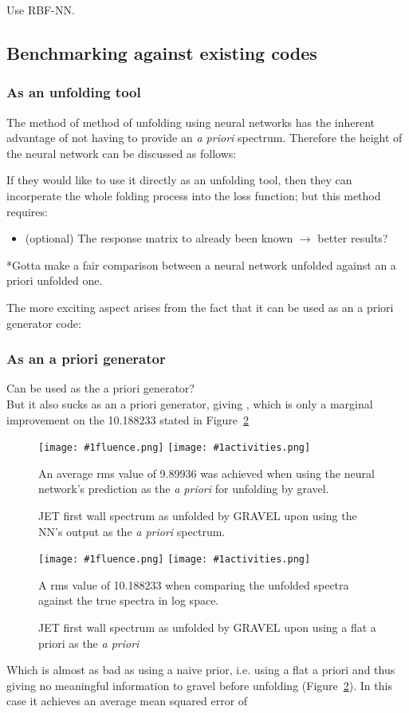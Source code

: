 \documentclass[a4paper, 12pt]{article}
\newcommand{\fluenceandactivities}[1]{
\texttt{[image: \#1fluence.png]}
\texttt{[image: \#1activities.png]}
}
\begin{document}
Use RBF-NN.

\subsection{Benchmarking against existing codes}
\subsubsection{As an unfolding tool}
The method of method of unfolding using neural networks has the inherent advantage of not having to provide an \emph{a priori} spectrum. Therefore the height of the neural network can be discussed as follows:

If they would like to use it directly as an unfolding tool, then they can incorperate the whole folding process into the loss function; but this method requires:
\begin{itemize}
    \item (optional) The response matrix to already been known $\rightarrow$ better results?
\end{itemize}
*Gotta make a fair comparison between a neural network unfolded against an a priori unfolded one.

The more exciting aspect arises from the fact that it can be used as an a priori generator code:
\subsubsection{As an a priori generator}
Can be used as the a priori generator?\\
But it also sucks as an a priori generator, giving , which is only a marginal improvement on the 10.188233 stated in Figure~\ref{gravel_flat_a_priori_JET}
\begin{figure}
    \centering
    \fluenceandactivities{/home/ocean/Documents/GitHubDir/unfolding/unfolding/unfoldingsuite/neuralnetwork/realinputEarlyStopping/comparison/real_fusion_test_gravel_nn_a_priori_test_001_}
    \caption{JET first wall spectrum as unfolded by GRAVEL upon using the NN's output as the \emph{a priori} spectrum.}\label{gravel_nn_a_priori_JET}
    An average rms value of 9.89936 was achieved when using the neural network's prediction as the \emph{a priori} for unfolding by gravel.
\end{figure}

\begin{figure}
\centering
    \fluenceandactivities{/home/ocean/Documents/GitHubDir/unfolding/unfolding/unfoldingsuite/neuralnetwork/realinputEarlyStopping/comparison/real_fusion_test_gravel_test_001_}
    \caption{JET first wall spectrum as unfolded by GRAVEL upon using a flat a priori as the \emph{a priori}}\label{gravel_flat_a_priori_JET}
    A rms value of 10.188233 when comparing the unfolded spectra against the true spectra in log space.
\end{figure}
Which is almost as bad as using a naive prior, i.e. using a flat a priori and thus giving no meaningful information to gravel before unfolding (Figure~\ref{gravel_flat_a_priori_JET}). In this case it achieves an average mean squared error of 
\end{document}
